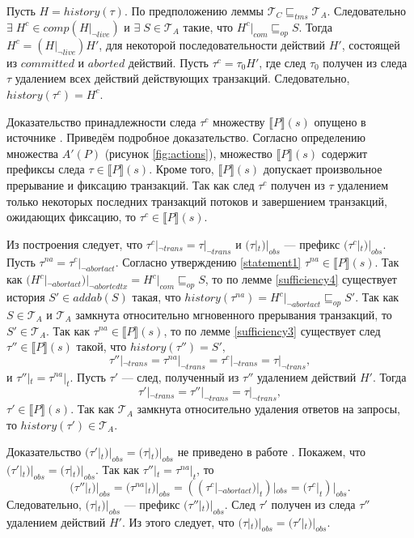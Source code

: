 \begin{myproof}
Пусть $H = history(\tau)$. По предположению леммы $\mathcal{T}_C \sqsubseteq_{tms} \mathcal{T}_A$. Следовательно $\exists \; H^c \in comp(H|_{\neg live})$ и $\exists \; S \in \mathcal{T}_A$ такие, что $H^c|_{com} \sqsubseteq_{op} S$. Тогда $H^c = (H|_{\neg live})H'$, для некоторой последовательности действий $H'$, состоящей из $committed$ и $aborted$ действий.  Пусть $\tau^c = \tau_0H'$, где след $\tau_0$ получен из следа $\tau$ удалением всех действий действующих транзакций. Следовательно, $history(\tau^c) = H^c$.

Доказательство принадлежности следа $\tau^c$ множеству $\llbracket P \rrbracket(s)$ опущено в источнике \cite{tms_article}. Приведём подробное доказательство. Согласно определению множества $A'(P)$ (рисунок \ref{fig:actions}), множество $\llbracket P\rrbracket(s)$ содержит префиксы следа $\tau \in \llbracket P\rrbracket(s)$. Кроме того, $\llbracket P\rrbracket(s)$ допускает произвольное прерывание и фиксацию транзакций. Так как след $\tau^c$ получен из $\tau$ удалением только некоторых последних транзакций потоков и завершением транзакций, ожидающих фиксацию, то $\tau^c \in \llbracket P\rrbracket(s)$. 

Из построения следует, что $\tau^c|_{\neg trans} = \tau|_{\neg trans}$ и $(\tau|_t)|_{obs}$ --- префикс $(\tau^c|_t)|_{obs}$. Пусть $\tau^{na} = \tau^c|_{\neg abortact}$. Согласно утверждению \ref{statement1} $\tau^{na} \in \llbracket P \rrbracket(s)$. Так как $(H^c|_{\neg abortact})|_{\neg abortedtx} = H^c|_{com} \sqsubseteq_{op} S$, то по лемме \ref{sufficiency4}
существует история $S' \in addab(S)$ такая, что $history(\tau^{na}) = H^c|_{\neg abortact} \sqsubseteq_{op} S'$. Так как $S \in \mathcal{T}_A$ и $\mathcal{T}_A$ замкнута относительно мгновенного прерывания транзакций, то $S' \in \mathcal{T}_A$. Так как $\tau^{na} \in \llbracket P \rrbracket(s)$, то по лемме \ref{sufficiency3} существует след $\tau'' \in \llbracket P \rrbracket(s)$ такой, что $history(\tau'') = S',$ $$\tau''|_{\neg trans} = \tau^{na}|_{\neg trans} = \tau^c|_{\neg trans} = \tau|_{\neg trans},$$ и $\tau''|_t = \tau^{na}|_t$. Пусть $\tau'$ --- след, полученный из $\tau''$ удалением действий $H'$. Тогда $$\tau'|_{\neg trans} = \tau''|_{\neg trans} = \tau|_{\neg trans},$$ $\tau' \in \llbracket P\rrbracket(s)$. Так как $\mathcal{T}_A$ замкнута относительно удаления ответов на запросы, то $history(\tau') \in \mathcal{T}_A$.

Доказательство $(\tau'|_t)|_{obs} = (\tau|_t)|_{obs}$ не приведено в работе \cite{tms_article}. Покажем, что $(\tau'|_t)|_{obs} = (\tau|_t)|_{obs}$. Так как $\tau''|_t = \tau^{na}|_t$, то $$(\tau''|_t)|_{obs} = (\tau^{na}|_t)|_{obs} = ((\tau^c|_{\neg abortact})|_t)|_{obs} = (\tau^c|_t)|_{obs}.$$ Следовательно, $(\tau|_t)|_{obs}$ --- префикс $(\tau''|_t)|_{obs}$. След $\tau'$ получен из следа $\tau''$ удалением действий $H'$. Из этого следует, что $(\tau|_t)|_{obs} = (\tau'|_t)|_{obs}$.
\end{myproof}

